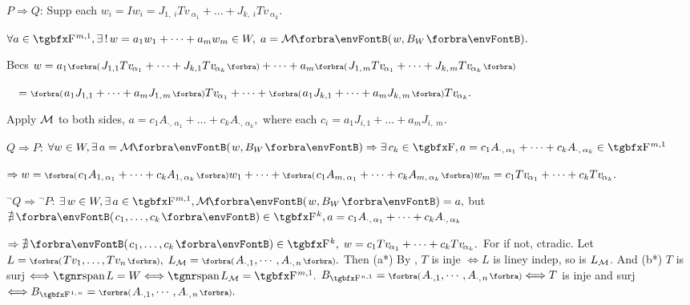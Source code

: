 $P\Rightarrow Q:$\,\;Supp each $w_i=Iw_i=J_{1,\;\!i}Tv_{\:\!\!\alpha_1}+\dots+J_{k,\;\!i}Tv_{\:\!\!\alpha_k}.$\par\quad\Hb
$\forall a\in\FbbP{m,1},\exists\,!\,w=a_1w_1+\dots+a_mw_m\in W,\;a=\Mt{w,B_W}.$\par\quad\Hb
{}Becs $w=a_1\BigPar{J_{1,1}Tv_{\:\!\!\alpha_1}+\dots+J_{k,1}Tv_{\:\!\!\alpha_k}}+\dots+a_m\BigPar{J_{1,\;\!m}Tv_{\:\!\!\alpha_1}+\dots+J_{k,\;\!m}Tv_{\:\!\!\alpha_k}}$\par\vspace{2pt}\quad\Hb
{} $\Blind{w}=\BigPar{a_1J_{1,1}+\dots+a_mJ_{1,\;\!m}}Tv_{\:\!\!\alpha_1}+\dots+\BigPar{a_1J_{k,1}+\dots+a_mJ_{k,\;\!m}}Tv_{\:\!\!\alpha_k}.$\par\vspace{2pt}\quad\Hb
{}Apply $\mathcal{M}$ to both sides, $a=c_1A_{\cdot,\,\alpha_1}+\dots+c_kA_{\cdot,\,\alpha_k},$ where each $c_i=a_1J_{i,1}+\dots+a_mJ_{i,\;\!m}.$\par\vspace{6pt}\quad\Hb
$Q\Rightarrow P:$\,\;$\forall w\in W,\exists\,\!\,a=\Mt{w,B_W}\Rightarrow\exists\,c_k\in\Fbb,a=c_1A_{\cdot,\,{\alpha_1}}+\dots+c_kA_{\cdot,\,\alpha_k}\in\FbbP{m,1}$\par\quad\Hb
{}$\Rightarrow w=\BigPar{c_1A_{1,\,{\alpha_1}}+\dots+c_kA_{1,\,{\alpha_k}}}w_1+\dots+\BigPar{c_1A_{m,\,{\alpha_1}}+\dots+c_kA_{m,\,{\alpha_k}}}w_m=c_1Tv_{\:\!\!\alpha_1}+\dots+c_kTv_{\:\!\!\alpha_k}.$\vspace{6pt}\par\quad\Hb
${}{^\neg}Q\Rightarrow{}{^\neg}P:$\,\;$\exists\,w\in W,\exists\,a\in\FbbP{m,1},\Mt{w,B_W}=a,$ but $\nexists\,\Par{c_1,\dots,c_k}\in\FbbP{k},a=c_1A_{\cdot,\,\alpha_1}+\dots+c_kA_{\cdot,\,\alpha_k}$\par\quad\Hb
{}$\Rightarrow\nexists\,\Par{c_1,\dots,c_k}\in\FbbP{k},\;w=c_1Tv_{\:\!\!\alpha_1}+\dots+c_kTv_{\:\!\!\alpha_k}.$ For if not, ctradic.\PfEnd\vspace{6pt}
\ANote Let $L=\BigPar{Tv_1,\dots,Tv_n},\;L_{\mM}=\BigPar{A_{\cdot,1},\cdots,A_{\cdot,\;\!n}}.$\parNot
Then (a*) By , $T$ is inje $\Longleftrightarrow L$ is liney indep, so is $L_{\mathcal{M}}$.\parNot
And (b*) $T$ is surj $\Longleftrightarrow\spn L=W\Longleftrightarrow\spn L_{\mM}=\FbbP{m,1}.$\parNot
\ACoro $B_{\FbbP{n,1}}=\BigPar{A_{\cdot,1},\cdots,A_{\cdot,\;\!n}}\Longleftrightarrow T$ is inje and surj $\Longleftrightarrow B_{\FbbP{1,\;\!n}}=\BigPar{A_{\cdot,1},\cdots,A_{\cdot,\;\!n}}.$\parNot
